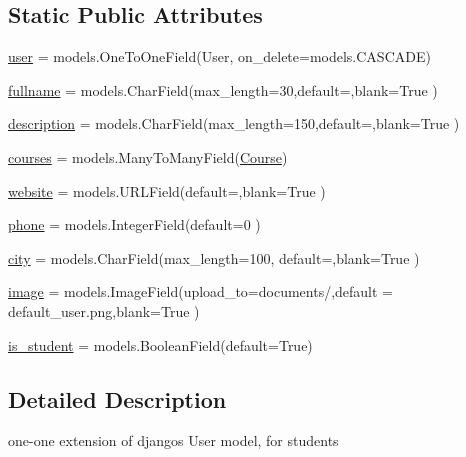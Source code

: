 \subsection*{Static Public Attributes}
\begin{DoxyCompactItemize}
\item 
\hyperlink{classmodels_1_1_student_af515b90fd2258a0d7bf779946770f2e2}{user} = models.\+One\+To\+One\+Field(User, on\+\_\+delete=models.\+C\+A\+S\+C\+A\+DE)
\item 
\hyperlink{classmodels_1_1_student_ab4ed9dee0a1821211cf1c01a20a1d47a}{fullname} = models.\+Char\+Field(max\+\_\+length=30,default=\textquotesingle{}\textquotesingle{},blank=True )
\item 
\hyperlink{classmodels_1_1_student_a4192c4a7c2e12ed0d407a74093096771}{description} = models.\+Char\+Field(max\+\_\+length=150,default=\textquotesingle{}\textquotesingle{},blank=True )
\item 
\hyperlink{classmodels_1_1_student_a6749b01c6de12bccd3ada74c778b86a0}{courses} = models.\+Many\+To\+Many\+Field(\hyperlink{classmodels_1_1_course}{Course})
\item 
\hyperlink{classmodels_1_1_student_a9742d2ab97c25d48890034da4cbea75f}{website} = models.\+U\+R\+L\+Field(default=\textquotesingle{}\textquotesingle{},blank=True )
\item 
\hyperlink{classmodels_1_1_student_a86dc47ebb9cf9848a3b8e5b72adaee3a}{phone} = models.\+Integer\+Field(default=0 )
\item 
\hyperlink{classmodels_1_1_student_ad7ab582e78f1d084b64de4af421bec2e}{city} = models.\+Char\+Field(max\+\_\+length=100, default=\textquotesingle{}\textquotesingle{},blank=True )
\item 
\hyperlink{classmodels_1_1_student_abcc5eda4213b411b56e55ab7627a5fe0}{image} = models.\+Image\+Field(upload\+\_\+to=\textquotesingle{}documents/\textquotesingle{},default = \textquotesingle{}default\+\_\+user.\+png\textquotesingle{},blank=True )
\item 
\hyperlink{classmodels_1_1_student_a9d3cb9ca10feca6110cd0bcf89145e7c}{is\+\_\+student} = models.\+Boolean\+Field(default=True)
\end{DoxyCompactItemize}


\subsection{Detailed Description}
one-\/one extension of django\textquotesingle{}s User model, for students 

